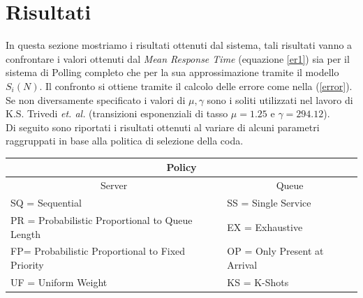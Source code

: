 \documentclass[12pt,a4paper,italian]{article}
\begin{document}
\section{Risultati}
\thispagestyle{plain}
In questa sezione mostriamo i risultati ottenuti dal sistema, tali risultati vanno a confrontare i valori ottenuti dal \emph{Mean Response Time} (equazione \ref{er1}) sia per il sistema di Polling completo che per la sua approssimazione tramite il modello $S_i(N)$. Il confronto si ottiene tramite il calcolo delle errore come nella (\ref{error}).
Se non diversamente specificato i valori di $\mu, \gamma$ sono i soliti utilizzati nel lavoro di K.S. Trivedi \emph{et. al.}\cite{fixedpoint} (transizioni esponenziali di tasso $\mu=1.25$ e $\gamma=294.12$).\\ Di seguito sono riportati i risultati ottenuti al variare di alcuni parametri raggruppati in base alla politica di selezione della coda.\\
\begin{table}[ht!]
	\centering
	\scriptsize
	\begin{tabular}{ll}
		\hline
		\multicolumn{2}{c}{Policy}                                                     \\ \hline
		\multicolumn{1}{c}{Server}                      & \multicolumn{1}{c}{Queue}    \\ \hline
		SQ = Sequential                                 & SS = Single Service          \\ \hline
		PR = Probabilistic Proportional to Queue Length & EX = Exhaustive              \\ \hline
		FP= Probabilistic Proportional to Fixed Priority                         & OP = Only Present at Arrival \\ \hline
		UF = Uniform Weight                             & KS = K-Shots                 \\ \hline
	\end{tabular}
\end{table}
\end{document}
